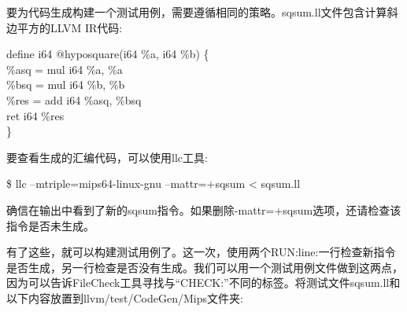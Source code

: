 要为代码生成构建一个测试用例，需要遵循相同的策略。sqsum.ll文件包含计算斜边平方的LLVM IR代码:\par

\begin{tcolorbox}[colback=white,colframe=black]
define i64 @hyposquare(i64 \%a, i64 \%b) \{ \\
\hspace*{0.5cm}\%asq = mul i64 \%a, \%a \\
\hspace*{0.5cm}\%bsq = mul i64 \%b, \%b \\
\hspace*{0.5cm}\%res = add i64 \%asq, \%bsq \\
\hspace*{0.5cm}ret i64 \%res \\
\}
\end{tcolorbox}

要查看生成的汇编代码，可以使用llc工具:\par

\begin{tcolorbox}[colback=white,colframe=black]
\$ llc –mtriple=mips64-linux-gnu –mattr=+sqsum < sqsum.ll
\end{tcolorbox}

确信在输出中看到了新的sqsum指令。如果删除-mattr=+sqsum选项，还请检查该指令是否未生成。\par

有了这些，就可以构建测试用例了。这一次，使用两个RUN:line:一行检查新指令是否生成，另一行检查是否没有生成。我们可以用一个测试用例文件做到这两点，因为可以告诉FileCheck工具寻找与“CHECK:”不同的标签。将测试文件sqsum.ll和以下内容放置到llvm/test/CodeGen/Mips文件夹:\par

